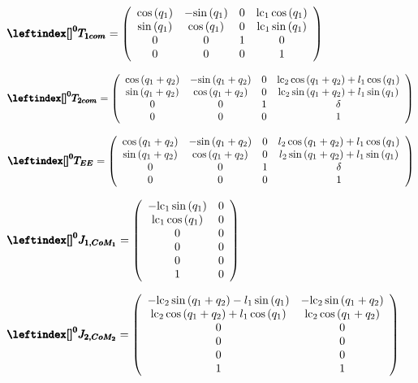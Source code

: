 \documentclass[12pt]{article}
\begin{document}
$\pmb{\leftindex[]^0{T}_{1com}}=\left(\begin{array}{cccc}
\mathrm{cos}\left(q_1 \right) & -\mathrm{sin}\left(q_1 \right) & 0 & {\textrm{lc}}_1 \,\mathrm{cos}\left(q_1 \right)\\
\mathrm{sin}\left(q_1 \right) & \mathrm{cos}\left(q_1 \right) & 0 & {\textrm{lc}}_1 \,\mathrm{sin}\left(q_1 \right)\\
0 & 0 & 1 & 0\\
0 & 0 & 0 & 1
\end{array}\right)$

$\pmb{\leftindex[]^0{T}_{2com}}=\left(\begin{array}{cccc}
\mathrm{cos}\left(q_1 +q_2 \right) & -\mathrm{sin}\left(q_1 +q_2 \right) & 0 & {\textrm{lc}}_2 \,\mathrm{cos}\left(q_1 +q_2 \right)+l_1 \,\mathrm{cos}\left(q_1 \right)\\
\mathrm{sin}\left(q_1 +q_2 \right) & \mathrm{cos}\left(q_1 +q_2 \right) & 0 & {\textrm{lc}}_2 \,\mathrm{sin}\left(q_1 +q_2 \right)+l_1 \,\mathrm{sin}\left(q_1 \right)\\
0 & 0 & 1 & \delta \\
0 & 0 & 0 & 1
\end{array}\right)$

$\pmb{\leftindex[]^0{T}_{EE}}=\left(\begin{array}{cccc}
\mathrm{cos}\left(q_1 +q_2 \right) & -\mathrm{sin}\left(q_1 +q_2 \right) & 0 & l_2 \,\mathrm{cos}\left(q_1 +q_2 \right)+l_1 \,\mathrm{cos}\left(q_1 \right)\\
\mathrm{sin}\left(q_1 +q_2 \right) & \mathrm{cos}\left(q_1 +q_2 \right) & 0 & l_2 \,\mathrm{sin}\left(q_1 +q_2 \right)+l_1 \,\mathrm{sin}\left(q_1 \right)\\
0 & 0 & 1 & \delta \\
0 & 0 & 0 & 1
\end{array}\right)$

$\pmb{\leftindex[]^0{J}_{1,CoM_1}}=\left(\begin{array}{cc}
-{\textrm{lc}}_1 \,\mathrm{sin}\left(q_1 \right) & 0\\
{\textrm{lc}}_1 \,\mathrm{cos}\left(q_1 \right) & 0\\
0 & 0\\
0 & 0\\
0 & 0\\
1 & 0
\end{array}\right)$

$\pmb{\leftindex[]^0{J}_{2,CoM_2}}=\left(\begin{array}{cc}
-{\textrm{lc}}_2 \,\mathrm{sin}\left(q_1 +q_2 \right)-l_1 \,\mathrm{sin}\left(q_1 \right) & -{\textrm{lc}}_2 \,\mathrm{sin}\left(q_1 +q_2 \right)\\
{\textrm{lc}}_2 \,\mathrm{cos}\left(q_1 +q_2 \right)+l_1 \,\mathrm{cos}\left(q_1 \right) & {\textrm{lc}}_2 \,\mathrm{cos}\left(q_1 +q_2 \right)\\
0 & 0\\
0 & 0\\
0 & 0\\
1 & 1
\end{array}\right)$
\end{document}
